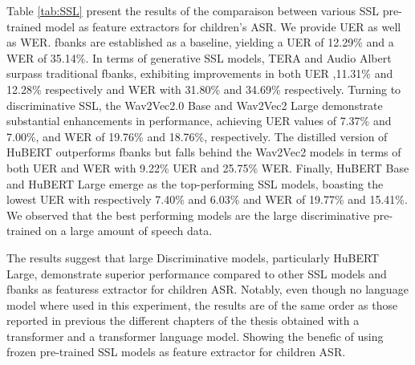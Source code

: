 Table \ref{tab:SSL} present the results of the comparaison between various \ac{SSL} pre-trained model as feature extractors for children's \ac{ASR}. We provide \ac{UER} as well as \ac{WER}. \ac{fbanks} are established as a baseline, yielding a \ac{UER} of 12.29\% and a \ac{WER} of 35.14\%. In terms of generative \ac{SSL} models, TERA  and Audio Albert surpass traditional \ac{fbanks}, exhibiting improvements in both \ac{UER} ,11.31\% and 12.28\% respectively and \ac{WER} with 31.80\% and 34.69\% respectively. Turning to discriminative \ac{SSL}, the Wav2Vec2.0 Base and Wav2Vec2 Large demonstrate substantial enhancements in performance, achieving \ac{UER} values of 7.37\% and 7.00\%, and \ac{WER} of 19.76\% and 18.76\%, respectively. The distilled version of HuBERT outperforms \ac{fbanks} but falls behind the Wav2Vec2 models in terms of both \ac{UER} and \ac{WER} with 9.22\% \ac{UER} and 25.75\% \ac{WER}. Finally, HuBERT Base and HuBERT Large emerge as the top-performing \ac{SSL} models, boasting the lowest \ac{UER} with respectively 7.40\% and 6.03\% and \ac{WER} of 19.77\% and 15.41\%. We observed that the best performing models are the large discriminative pre-trained on a large amount of speech data.

The results suggest that large Discriminative models, particularly HuBERT Large, demonstrate superior performance compared to other \ac{SSL} models and \ac{fbanks} as featuress extractor for children \ac{ASR}. Notably, even though no language model where used in this experiment, the results are of the same order as those reported in previous the different chapters of the thesis obtained with a transformer and a transformer language model. Showing the benefic of using frozen pre-trained \ac{SSL} models as feature extractor for children \ac{ASR}.

